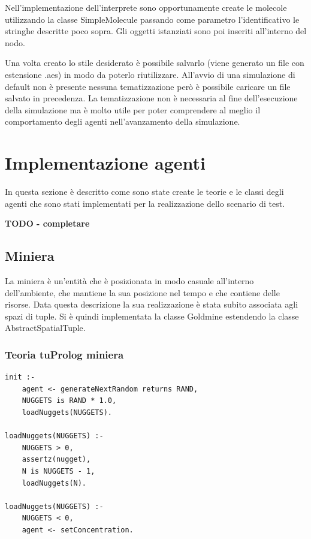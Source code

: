 Nell'implementazione dell'interprete sono opportunamente create le molecole utilizzando la classe SimpleMolecule passando come parametro l'identificativo le stringhe descritte poco sopra. Gli oggetti istanziati sono poi inseriti all'interno del nodo.

Una volta creato lo stile desiderato è possibile salvarlo (viene generato un file con estensione .aes) in modo da poterlo riutilizzare.
All'avvio di una simulazione di default non è presente nessuna tematizzazione però è possibile caricare un file salvato in precedenza.
La tematizzazione non è necessaria al fine dell'esecuzione della simulazione ma è molto utile per poter comprendere al meglio il comportamento degli agenti nell'avanzamento della simulazione.


\section{Implementazione agenti}
In questa sezione è descritto come sono state create le teorie e le classi degli agenti che sono stati implementati per la realizzazione dello scenario di test.

\textbf{TODO - completare}


\subsection{Miniera}
La miniera è un'entità che è posizionata in modo casuale all'interno dell'ambiente, che mantiene la sua posizione nel tempo e che contiene delle risorse.
Data questa descrizione la sua realizzazione è stata subito associata agli spazi di tuple. Si è quindi implementata la classe Goldmine estendendo la classe AbstractSpatialTuple.

\subsubsection{Teoria tuProlog miniera}

\medskip
\begin{lstlisting}[firstnumber=1,label={lst:Goldmine},caption={Teoria miniera}]
init :-
    agent <- generateNextRandom returns RAND,
    NUGGETS is RAND * 1.0,
    loadNuggets(NUGGETS).

loadNuggets(NUGGETS) :-
    NUGGETS > 0,
    assertz(nugget),
    N is NUGGETS - 1,
    loadNuggets(N).

loadNuggets(NUGGETS) :-
    NUGGETS < 0,
    agent <- setConcentration.
\end{lstlisting}


